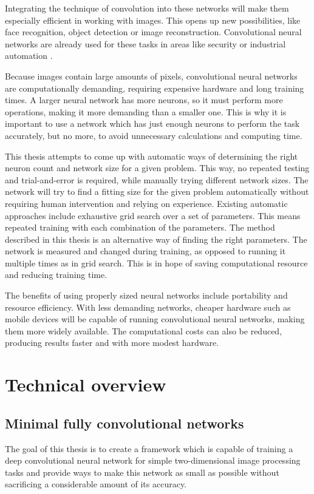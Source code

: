 \documentclass[12pt]{report}
\begin{document}
Integrating the technique of convolution into these networks will make them especially efficient in working with images. This opens up new possibilities, like face recognition, object detection or image reconstruction. Convolutional neural networks are already used for these tasks in areas like security or industrial automation \cite{applications}.

Because images contain large amounts of pixels, convolutional neural networks are computationally demanding, requiring expensive hardware and long training times. A larger neural network has more neurons, so it must perform more operations, making it more demanding than a smaller one. This is why it is important to use a network which has just enough neurons to perform the task accurately, but no more, to avoid unnecessary calculations and computing time.

This thesis attempts to come up with automatic ways of determining the right neuron count and network size for a given problem. This way, no repeated testing and trial-and-error is required, while manually trying different network sizes. The network will try to find a fitting size for the given problem automatically without requiring human intervention and relying on experience. Existing automatic approaches include exhaustive grid search over a set of parameters. This means repeated training with each combination of the parameters. The method described in this thesis is an alternative way of finding the right parameters. The network is measured and changed during training, as opposed to running it multiple times as in grid search. This is in hope of saving computational resource and reducing training time.

The benefits of using properly sized neural networks include portability and resource efficiency. With less demanding networks, cheaper hardware such as mobile devices will be capable of running convolutional neural networks, making them more widely available. The computational costs can also be reduced, producing results faster and with more modest hardware.

\chapter{Technical overview}
\section{Minimal fully convolutional networks}
The goal of this thesis is to create a framework which is capable of training a deep convolutional neural network for simple two-dimensional image processing tasks and provide ways to make this network as small as possible without sacrificing a considerable amount of its accuracy.
\end{document}
